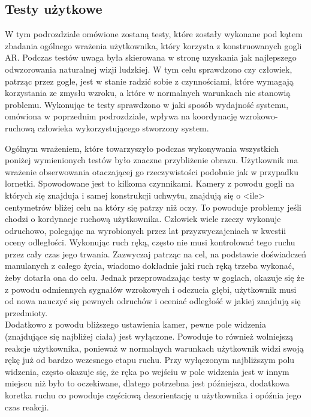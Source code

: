 \documentclass[a4paper,11pt,twoside]{report}
\theoremstyle{definition}
\begin{document}
\subsection{Testy użytkowe}

W tym podrozdziale omówione zostaną testy, które zostały wykonane pod kątem zbadania ogólnego wrażenia użytkownika, który korzysta z konstruowanych gogli AR. Podczas testów uwaga była skierowana w stronę uzyskania jak najlepszego odwzorowania naturalnej wizji ludzkiej. W tym celu sprawdzono czy człowiek, patrząc przez gogle, jest w stanie radzić sobie z czynnościami, które wymagają korzystania ze zmysłu wzroku, a które w normalnych warunkach nie stanowią problemu. Wykonując te testy sprawdzono w jaki sposób wydajność systemu, omówiona w poprzednim podrozdziale, wpływa na koordynację wzrokowo-ruchową człowieka wykorzystującego stworzony system.

Ogólnym wrażeniem, które towarzyszyło podczas wykonywania wszystkich poniżej wymienionych testów było znaczne przybliżenie obrazu. Użytkownik ma wrażenie obserwowania otaczającej go rzeczywistości podobnie jak w przypadku lornetki. Spowodowane jest to kilkoma czynnikami. Kamery z powodu gogli na których się znajduja i samej konstrukcji uchwytu, znajdują się o <ile> centymetrów bliżej celu na który się patrzy niż oczy.  To powoduje problemy jeśli chodzi o kordynacje ruchową użytkownika. Człowiek wiele rzeczy wykonuje odruchowo, polegając na wyrobionych przez lat przyzwyczajeniach w kwestii oceny odległości. Wykonując ruch ręką, często nie musi kontrolować tego ruchu przez cały czas jego trwania. Zazwyczaj patrząc na cel, na podstawie doświadczeń manulanych z całego życia, wiadomo dokładnie jaki ruch ręką trzeba wykonać, żeby dotarła ona do celu. Jednak przeprowadzając testy w goglach, okazuje się że z powodu odmiennych sygnałów wzrokowych i odczucia głębi, użytkownik musi od nowa nauczyć się pewnych odruchów i oceniać odległość w jakiej znajdują się przedmioty. \\

Dodatkowo z powodu bliższego ustawienia kamer, pewne pole widzenia  (znajdujące się najbliżej ciała) jest wyłączone. Powoduje to również wolniejszą reakcje użytkownika, ponieważ w normalnych warunkach użytkownik widzi swoją rękę już od bardzo wczesnego etapu ruchu. Przy wyłączonym najbliższym polu widzenia, często okazuje się, że ręka po wejściu w pole widzenia jest w innym miejscu niż było to oczekiwane, dlatego  potrzebna jest późniejsza, dodatkowa koretka ruchu co powoduje częściową dezorientację u użytkownika i opóźnia jego czas reakcji.
\end{document}
